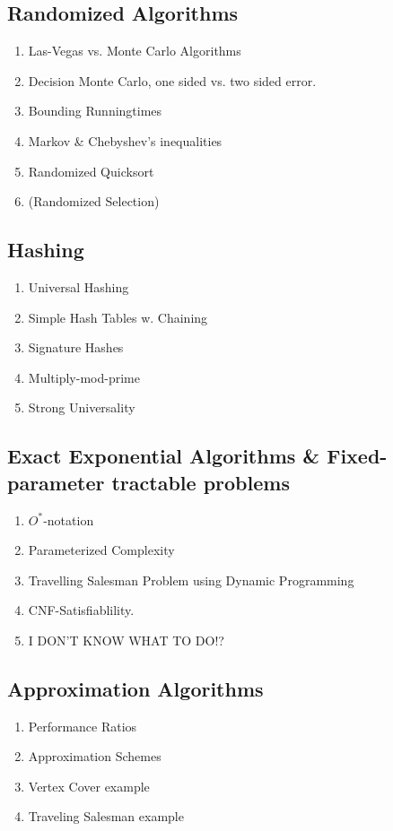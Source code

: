 \subsection{Randomized Algorithms}
\begin{enumerate}
  \item Las-Vegas vs. Monte Carlo Algorithms
  \item Decision Monte Carlo, one sided vs. two sided error.
  \item Bounding Runningtimes
  \item Markov \& Chebyshev's inequalities
  \item Randomized Quicksort
  \item (Randomized Selection)
\end{enumerate}
\newpage

\subsection{Hashing}
\begin{enumerate}
  \item Universal Hashing
  \item Simple Hash Tables w. Chaining
  \item Signature Hashes
  \item Multiply-mod-prime
  \item Strong Universality
\end{enumerate}
\newpage

\subsection{Exact Exponential Algorithms \& Fixed-parameter tractable problems}
\begin{enumerate}
  \item $O^*$-notation
  \item Parameterized Complexity
  \item Travelling Salesman Problem using Dynamic Programming
  \item CNF-Satisfiablility.
  \item I DON'T KNOW WHAT TO DO!?
\end{enumerate}
\newpage

\subsection{Approximation Algorithms}
\begin{enumerate}
  \item Performance Ratios
  \item Approximation Schemes
  \item Vertex Cover example
  \item Traveling Salesman example
\end{enumerate}
\newpage

